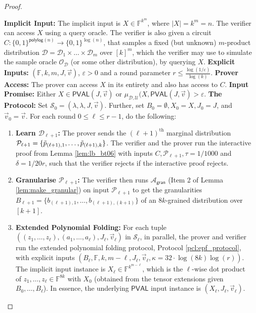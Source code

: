 \documentclass[10pt,a4paper]{article}
\makeatletter
\newcommand{\polylog}{\mathsf{polylog}}
\newcommand{\PVAL}{\mathsf{PVAL}}
\newcommand{\IPP}{\mathsf{IPP}}
\newcommand{\gran}{\mathsf{gran}}
\newcommand{\F}{\mathbb{F}}
\newcommand{\sU}{\mathcal{U}}
\newcommand{\sD}{\mathcal{D}}
\newcommand{\sO}{\mathcal{O}}
\newcommand{\sA}{\mathcal{A}}
\newcommand{\sP}{\mathcal{P}}
\newenvironment{protocol}[1][htb]{
    \renewcommand{\ALG@name}{Protocol}
    \begin{algorithm}[#1]
    }{\end{algorithm}
}
\makeatother
\begin{document}
\begin{proof}
\begin{protocol}[htp]
\caption{White-box $\IPP$ for $\PVAL$ over $m$-product distributions}
\label{pcl:dfipp_whitebox_pval}
\begin{algorithmic}{}
\vspace{0.1in}
\STATE \textbf{Implicit Input:} The implicit input is $X \in \F^{k^m}$, where $\vert X \vert = k^m = n$. The verifier can access $X$ using a query oracle. The verifier is also given a circuit $C: \{0,1\}^{\polylog(n)} \rightarrow \{0,1\}^{\log (n)}$, that samples a fixed (but unknown) $m$-product distribution $\sD = \sD_1 \times \dots \times \sD_m$ over $[k]^m$, which the verifier may use to simulate the sample oracle $\sO_\sD$ (or some other distribution), by querying $X$.
\vspace{0.1in}
\STATE \textbf{Explicit Inputs:} $(\F, k, m, J, \Vec{v})$, $\varepsilon > 0$ and a round parameter $r \leq \frac{\log(1/\varepsilon)}{\log (k)}$.
\vspace{0.1in}
\STATE \textbf{Prover Access:} The prover can access $X$ in its entirety and also has access to $C$.
\vspace{0.1in}
\STATE \textbf{Input Promise:} Either $X \in \PVAL(J,\Vec{v})$ or $\mu_{\sD,\sU} (X,\PVAL(J,\Vec{v}) > \varepsilon$.
\vspace{0.1in}
\STATE \textbf{The Protocol:}
\STATE Set $\mathcal{S}_0 = (\lambda, \lambda, J, \Vec{v})$. Further, set $B_0 = \emptyset, X_0 = X, J_0 = J$, and $\Vec{v}_0 = \Vec{v}$. 
\STATE For each round $0 \leq \ell \leq r-1$, do the following:
\begin{enumerate}
    \item \textbf{Learn $\sD_{\ell+1}$:} The prover sends the $(\ell+1)^{\text{th}}$ marginal distribution $\sP_{\ell+1} = \{\Tilde{p}_{(\ell+1),1}, \dots, \Tilde{p}_{(\ell+1),k}\}$. The verifier and the prover run the interactive proof from Lemma \ref{lem:lb_bt06} with inputs $C, \sP_{\ell+1}, \tau = 1/1000$ and $\delta = 1/20r$, such that the verifier rejects if the interactive proof rejects.
        
    \item \textbf{Granularise $\sP_{\ell+1}$:} The verifier then runs $\sA_\gran$ (Item 2 of Lemma \ref{lem:make_granular}) on input $\sP_{\ell+1}$ to get the granularities $B_{\ell+1} = \{b_{(\ell+1),1}, \dots, b_{(\ell+1),(k+1)}\}$ of an $8k$-grained distribution over $[k+1]$.
        
    \item \textbf{Extended Polynomial Folding:} For each tuple $((z_1, \dots, z_\ell),(a_1, \dots, a_\ell), J_\ell, \Vec{v}_\ell)$ in $\mathcal{S}_\ell$, in parallel, the prover and verifier run the extended polynomial folding protocol, Protocol \ref{pcl:epf_protocol}, with explicit inputs $(B_\ell, \F, k,m-\ell,J_\ell, \Vec{v}_\ell, \kappa=32\cdot\log (8k)\log (r))$. The implicit input instance is $X_\ell \in \F^{k^{m-\ell}}$, which is the $\ell$-wise dot product of $z_1, \dots, z_\ell \in \F^{8k}$ with $X_0$ (obtained from the tensor extensions given $B_0, \dots, B_\ell$). In essence, the underlying $\PVAL$ input instance is $(X_\ell, J_\ell, \Vec{v}_\ell)$.


\end{enumerate}
\end{algorithmic}
\end{protocol}
\end{proof}
\end{document}
